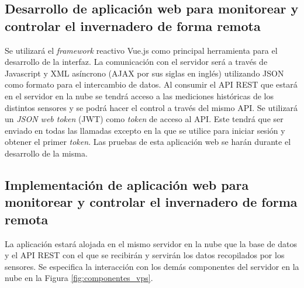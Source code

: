 \subsection{Desarrollo de aplicación web para monitorear y controlar el invernadero de forma remota}
Se utilizará el \textit{framework} reactivo Vue.js como principal herramienta para el desarrollo de la interfaz. La comunicación con el servidor será a través de Javascript y XML asíncrono (AJAX por sus siglas en inglés) utilizando JSON como formato para el intercambio de datos. Al consumir el API REST que estará en el servidor en la nube se tendrá acceso a las mediciones históricas de los distintos sensores y se podrá hacer el control a través del mismo API. Se utilizará un \textit{JSON web token} (JWT) como \textit{token} de acceso al API. Este tendrá que ser enviado en todas las llamadas excepto en la que se utilice para iniciar sesión y obtener el primer \textit{token}. Las pruebas de esta aplicación web se harán durante el desarrollo de la misma.

\subsection{Implementación de aplicación web para monitorear y controlar el invernadero de forma remota}
La aplicación estará alojada en el mismo servidor en la nube que la base de datos y el API REST con el que se recibirán y servirán los datos recopilados por los sensores. Se especifica la interacción con los demás componentes del servidor en la nube en la Figura \ref{fig:componentes_vps}.






